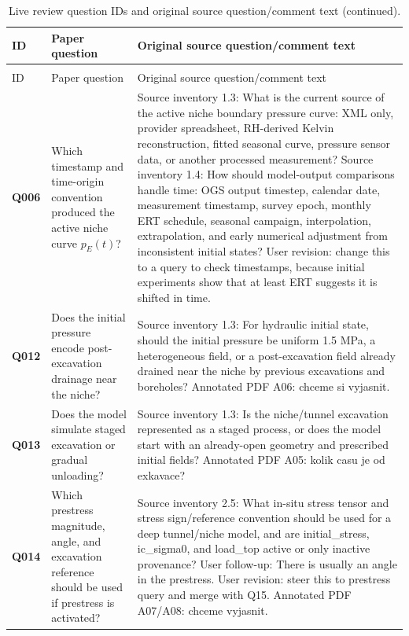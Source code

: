 \begin{longtable}{@{}L{0.10\textwidth} L{0.30\textwidth} L{0.52\textwidth}@{}}
\caption{Live review question IDs and original source question/comment text.}\label{tab:review-question-source-register}\\
\toprule
ID & Paper question & Original source question/comment text\\
\midrule
\endfirsthead
\caption[]{Live review question IDs and original source question/comment text (continued).}\\
\toprule
ID & Paper question & Original source question/comment text\\
\midrule
\endhead
\bottomrule
\endlastfoot
\textbf{Q006} & Which timestamp and time-origin convention produced the active niche curve \(p_E(t)\)? & Source inventory 1.3: What is the current source of the active niche boundary pressure curve: XML only, provider spreadsheet, RH-derived Kelvin reconstruction, fitted seasonal curve, pressure sensor data, or another processed measurement? Source inventory 1.4: How should model-output comparisons handle time: OGS output timestep, calendar date, measurement timestamp, survey epoch, monthly ERT schedule, seasonal campaign, interpolation, extrapolation, and early numerical adjustment from inconsistent initial states? User revision: change this to a query to check timestamps, because initial experiments show that at least ERT suggests it is shifted in time.\\
\addlinespace[0.22em]
\textbf{Q012} & Does the initial pressure encode post-excavation drainage near the niche? & Source inventory 1.3: For hydraulic initial state, should the initial pressure be uniform 1.5 MPa, a heterogeneous field, or a post-excavation field already drained near the niche by previous excavations and boreholes? Annotated PDF A06: chceme si vyjasnit.\\
\addlinespace[0.22em]
\textbf{Q013} & Does the model simulate staged excavation or gradual unloading? & Source inventory 1.3: Is the niche/tunnel excavation represented as a staged process, or does the model start with an already-open geometry and prescribed initial fields? Annotated PDF A05: kolik casu je od exkavace?\\
\addlinespace[0.22em]
\textbf{Q014} & Which prestress magnitude, angle, and excavation reference should be used if prestress is activated? & Source inventory 2.5: What in-situ stress tensor and stress sign/reference convention should be used for a deep tunnel/niche model, and are initial\_stress, ic\_sigma0, and load\_top active or only inactive provenance? User follow-up: There is usually an angle in the prestress. User revision: steer this to prestress query and merge with Q15. Annotated PDF A07/A08: chceme vyjasnit.\\

\end{longtable}
